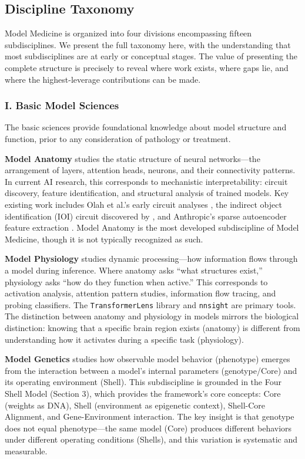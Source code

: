 \documentclass[11pt]{article}
\begin{document}
\subsection{Discipline Taxonomy}

Model Medicine is organized into four divisions encompassing fifteen subdisciplines. We present the full taxonomy here, with the understanding that most subdisciplines are at early or conceptual stages. The value of presenting the complete structure is precisely to reveal where work exists, where gaps lie, and where the highest-leverage contributions can be made.

\subsubsection{I. Basic Model Sciences}

The basic sciences provide foundational knowledge about model structure and function, prior to any consideration of pathology or treatment.

\textbf{Model Anatomy} studies the static structure of neural networks---the arrangement of layers, attention heads, neurons, and their connectivity patterns. In current AI research, this corresponds to mechanistic interpretability: circuit discovery, feature identification, and structural analysis of trained models. Key existing work includes Olah et al.'s early circuit analyses \citep{Olah2020}, the indirect object identification (IOI) circuit discovered by \citet{Wang2023}, and Anthropic's sparse autoencoder feature extraction \citep{Templeton2024}. Model Anatomy is the most developed subdiscipline of Model Medicine, though it is not typically recognized as such.

\textbf{Model Physiology} studies dynamic processing---how information flows through a model during inference. Where anatomy asks ``what structures exist,'' physiology asks ``how do they function when active.'' This corresponds to activation analysis, attention pattern studies, information flow tracing, and probing classifiers. The \texttt{TransformerLens} library \citep{Nanda2022} and \texttt{nnsight} are primary tools. The distinction between anatomy and physiology in models mirrors the biological distinction: knowing that a specific brain region exists (anatomy) is different from understanding how it activates during a specific task (physiology).

\textbf{Model Genetics} studies how observable model behavior (phenotype) emerges from the interaction between a model's internal parameters (genotype/Core) and its operating environment (Shell). This subdiscipline is grounded in the Four Shell Model (Section 3), which provides the framework's core concepts: Core (weights as DNA), Shell (environment as epigenetic context), Shell-Core Alignment, and Gene-Environment interaction. The key insight is that genotype does not equal phenotype---the same model (Core) produces different behaviors under different operating conditions (Shells), and this variation is systematic and measurable.
\end{document}
